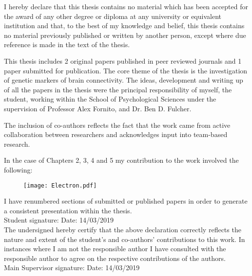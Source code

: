\vspace*{20mm}
\vspace{10mm}

I hereby declare that this thesis contains no material which has been accepted for the award of any other degree or diploma at any university or equivalent institution and that, to the best of my knowledge and belief, this thesis contains no material previously published or written by another person, except where due reference is made in the text of the thesis. 

This thesis includes 2 original papers published in peer reviewed journals and 1 paper submitted for publication. The core theme of the thesis is the investigation of genetic markers of brain connectivity. The ideas, development and writing up of all the papers in the thesis were the principal responsibility of myself, the student, working within the School of Psychological Sciences under the supervision of Professor Alex Fornito, and Dr. Ben D. Fulcher.

The inclusion of co-authors reflects the fact that the work came from active collaboration between researchers and acknowledges input into team-based research.

In the case of Chapters 2, 3, 4 and 5 my contribution to the work involved the following:


\begin{figure}[h!]
    \texttt{[image: Electron.pdf]}
\label{declaration}
\end{figure}

I have renumbered sections of submitted or published papers in order to generate a consistent presentation within the thesis.\\

Student signature:\hspace{6cm}
Date: 14/03/2019\\

The undersigned hereby certify that the above declaration correctly reflects the nature and extent of the student’s and co-authors’ contributions to this work. In instances where I am not the responsible author I have consulted with the responsible author to agree on the respective contributions of the authors.\\


Main Supervisor signature:\hspace{4.5cm}
Date: 14/03/2019\\

